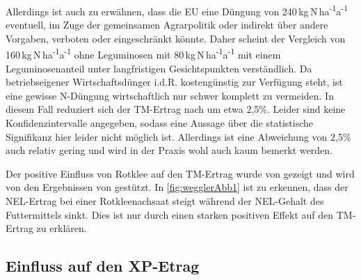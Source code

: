 Allerdings ist auch zu erwähnen, dass die \ac{EU} eine Düngung von 240\,kg\,N\,ha\textsuperscript{-1}a\textsuperscript{-1} eventuell, im Zuge der gemeinsamen Agrarpolitik oder indirekt über andere Vorgaben, verboten oder eingeschränkt könnte.
Daher scheint der Vergleich von 160\,kg\,N\,ha\textsuperscript{-1}a\textsuperscript{-1} ohne Leguminosen mit 80\,kg\,N\,ha\textsuperscript{-1}a\textsuperscript{-1} mit einem Leguminosenanteil unter langfristigen Gesichtspunkten verständlich.
Da betriebseigener Wirtschaftsdünger i.d.R. kostengünstig zur Verfügung steht, ist eine gewisse N-Düngung wirtschaftlich nur schwer komplett zu vermeiden.
In diesem Fall reduziert sich der \ac{TM}-Ertrag nach \textcite[11]{engel2013protein} um etwa 2,5\%.
Leider sind keine Konfidenzintervalle angegeben, sodass eine Aussage über die statistische Signifikanz hier leider nicht möglich ist.
Allerdings ist eine Abweichung von 2,5\% auch relativ gering und wird in der Praxis wohl auch kaum bemerkt werden.

Der positive Einfluss von Rotklee auf den \ac{TM}-Ertrag wurde von \textcite[242]{FrankowLindberg2009} gezeigt und wird von den Ergebnissen von \textcite[35]{weggler2050leguminosen} gestützt.
In \cref{fig:wegglerAbb1} ist zu erkennen, dass der \ac{NEL}-Ertrag bei einer Rotkleenachsaat steigt während der \ac{NEL}-Gehalt des Futtermittels sinkt.
Dies ist nur durch einen starken positiven Effekt auf den \ac{TM}-Ertrag zu erklären.



\subsection{Einfluss auf den \acl{XP}-Etrag}
\label{subsec:Protein}

